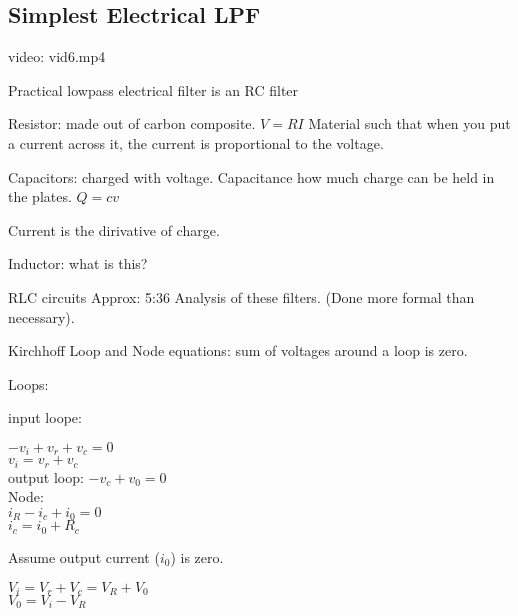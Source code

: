 \subsection*{Simplest Electrical LPF}

video: vid6.mp4

Practical lowpass electrical filter is an RC filter



Resistor: made out of carbon composite. $V=RI$ Material such that when you 
put a current across it, the current is proportional to the voltage.



Capacitors: charged with voltage. Capacitance %
how much charge can be held in the plates. $Q = cv$

Current is the dirivative of charge.




Inductor: what is this?

RLC circuits
Approx: 5:36
Analysis of these filters. (Done more formal than necessary).


Kirchhoff Loop and Node equations: sum of voltages around a loop is zero.

Loops: 

input loope:

$-v_i + v_r + v_c = 0$ \\
$v_i = v_r + v_c$ \\

output loop:
$-v_c + v_0 = 0$ \\

Node: \\
$i_R - i_c + i_0 = 0$\\
$i_c = i_0 + R_c$

Assume output current ($i_0$) is zero.


$V_i = V_r + V_c = V_R + V_0$ \\

$V_0 = V_i - V_R$ \\

